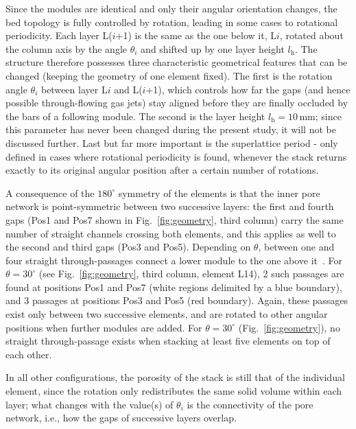 Since the modules are identical and only their angular orientation changes, the bed topology is fully controlled by rotation, leading in some cases to rotational periodicity. Each layer L($i$+1) is the same as the one below it, L$i$, rotated about the column axis by the angle $\theta_i$ and shifted up by one layer height $l_\mathrm{h}$. The structure therefore possesses three characteristic geometrical features that can be changed (keeping the geometry of one element fixed). The first is the rotation angle $\theta_i$ between layer L$i$ and L($i$+1), which controls how far the gaps (and hence possible through-flowing gas jets) stay aligned before they are finally occluded by the bars of a following module. The second is the layer height $l_\mathrm{h}=10\,\mathrm{mm}$; since this parameter has never been changed during the present study, it will not be discussed further. Last but far more important is the superlattice period - only defined in cases where rotational periodicity is found, whenever the stack returns exactly to its original angular position after a certain number of rotations.

A consequence of the $180^\circ$ symmetry of the elements is that the inner pore network is point-symmetric between two successive layers: the first and fourth gaps (Pos1 and Pos7 shown in Fig.~\ref{fig:geometry}, third column) carry the same number of straight channels crossing both elements, and this applies as well to the second and third gaps (Pos3 and Pos5). Depending on $\theta$, between one and four straight through-passages connect a lower module to the one above it~\cite{velten2026}. For $\theta=30^\circ$ (see Fig.~\ref{fig:geometry}, third column, element L14), 2 such passages are found at positions Pos1 and Pos7 (white regions delimited by a blue boundary), and 3 passages at positions Pos3 and Pos5 (red boundary). Again, these passages exist only between two successive elements, and are rotated to other angular positions when further modules are added. For $\theta=30^\circ$ (Fig.~\ref{fig:geometry}), no straight through-passage exists when stacking at least five elements on top of each other.

In all other configurations, the porosity of the stack is still that of the individual element, since the rotation only redistributes the same solid volume within each layer; what changes with the value(s) of $\theta_i$ is the connectivity of the pore network, i.e., how the gaps of successive layers overlap.

